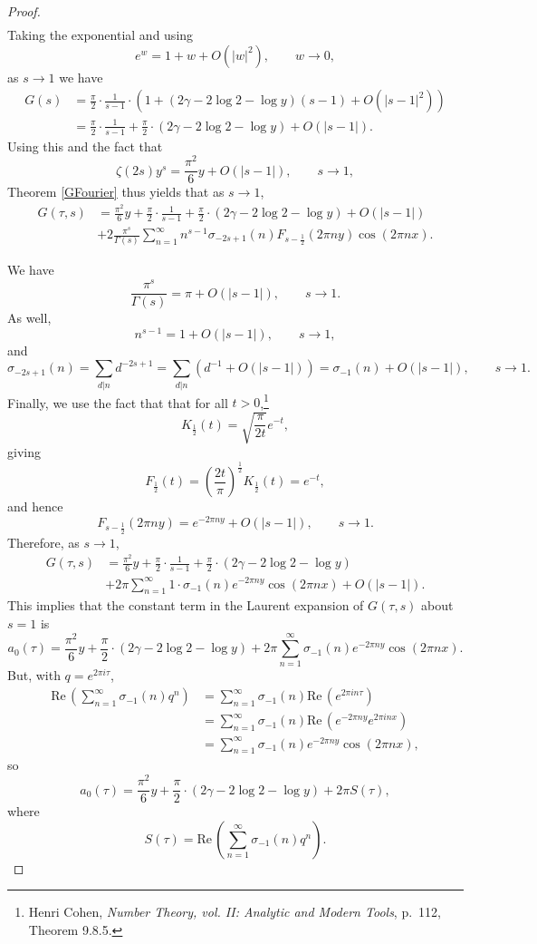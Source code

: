 \documentclass{article}
\def\Re{\ensuremath{\mathrm{Re}}\,}
\theoremstyle{definition}
\theoremstyle{definition}
\begin{document}
\begin{proof}
\begin{align*}
\end{align*}
Taking the exponential and using
\[
e^w = 1+w+O(|w|^2), \qquad w \to 0,
\]
 as $s \to 1$ we have
\begin{align*}
G(s)&=\frac{\pi}{2} \cdot \frac{1}{s-1} \cdot \left(1+(2\gamma-2\log 2-\log y)(s-1)+O(|s-1|^2)\right)\\
&=\frac{\pi}{2} \cdot \frac{1}{s-1} + \frac{\pi}{2}\cdot (2\gamma-2\log 2-\log y)+O(|s-1|).
\end{align*}
Using this and the fact that
\[
\zeta(2s)y^s = \frac{\pi^2}{6}y + O(|s-1|), \qquad s \to 1,
\]
Theorem \ref{GFourier}  thus yields that as $s \to 1$,
\begin{align*}
G(\tau,s)&=\frac{\pi^2}{6}y+\frac{\pi}{2} \cdot \frac{1}{s-1} + \frac{\pi}{2}\cdot (2\gamma-2\log 2-\log y)+O(|s-1|)\\
&+2\frac{\pi^s}{\Gamma(s)} \sum_{n=1}^\infty n^{s-1} \sigma_{-2s+1}(n) F_{s-\frac{1}{2}}(2\pi ny) \cos(2\pi nx).
\end{align*}

We have
\[
\frac{\pi^s}{\Gamma(s)} = \pi + O(|s-1|), \qquad s \to 1.
\]
As well,
\[
n^{s-1} = 1 +O(|s-1|), \qquad s \to 1,
\]
and 
\[
\sigma_{-2s+1}(n) = \sum_{d|n} d^{-2s+1} = \sum_{d|n} (d^{-1}+O(|s-1|))
=\sigma_{-1}(n) + O(|s-1|), \qquad s \to 1.
\]
Finally,
we use the fact that
that for all $t>0$,\footnote{Henri Cohen, {\em Number Theory, vol. II: Analytic and Modern Tools}, p.~112, Theorem 9.8.5.}
\[
K_{\frac{1}{2}}(t) = \sqrt{\frac{\pi}{2t}} e^{-t},
\]
giving
\[
F_{\frac{1}{2}}(t)=\left(\frac{2t}{\pi}\right)^{\frac{1}{2}} K_{\frac{1}{2}}(t) =  e^{-t},
\]
and hence
\[
F_{s-\frac{1}{2}}(2\pi ny)= e^{-2\pi ny}+O(|s-1|), \qquad s \to 1.
\]
Therefore, as $s \to 1$,
\begin{align*}
G(\tau,s)&=\frac{\pi^2}{6}y+\frac{\pi}{2} \cdot \frac{1}{s-1} + \frac{\pi}{2}\cdot (2\gamma-2\log 2-\log y)\\
&+2\pi \sum_{n=1}^\infty  1\cdot \sigma_{-1}(n) e^{-2\pi ny} \cos(2\pi nx)
+O(|s-1|).
\end{align*}
This implies that the constant term in the Laurent expansion of $G(\tau,s)$ about $s=1$ is
\[
a_0(\tau) = \frac{\pi^2}{6}y + \frac{\pi}{2}\cdot(2\gamma-2\log 2-\log y)
+2\pi \sum_{n=1}^\infty \sigma_{-1}(n) e^{-2\pi ny} \cos(2\pi nx).
\]
But, with $q=e^{2\pi i\tau}$,
\begin{align*}
\Re\left( \sum_{n=1}^\infty \sigma_{-1}(n) q^n \right)& = 
\sum_{n=1}^\infty \sigma_{-1}(n) \Re(e^{2\pi in\tau})\\
&=\sum_{n=1}^\infty \sigma_{-1}(n) \Re(e^{-2\pi ny} e^{2\pi inx})\\
&=\sum_{n=1}^\infty \sigma_{-1}(n) e^{-2\pi ny} \cos(2\pi nx),
\end{align*}
so
\[
a_0(\tau) =  \frac{\pi^2}{6}y + \frac{\pi}{2}\cdot(2\gamma-2\log 2-\log y)
+2\pi S(\tau),
\]
where
\[
S(\tau) = \Re\left( \sum_{n=1}^\infty \sigma_{-1}(n) q^n \right).
\]


\end{proof}
\end{document}
